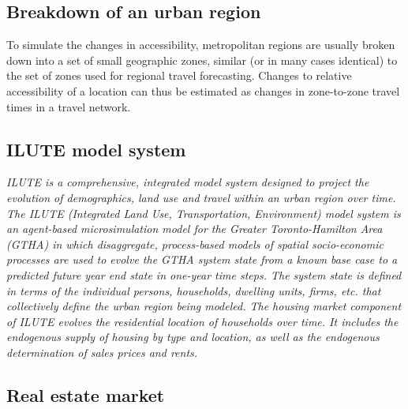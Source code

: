 \subsection{Breakdown of an urban region} \label{subsec:breakdown_of_urban_region}

To simulate the changes in accessibility, metropolitan regions are usually broken down into a set of small geographic zones, similar (or in many cases identical) to the set of zones used for regional travel forecasting.
Changes to relative accessibility of a location can thus be estimated as changes in zone-to-zone travel times in a travel network\cite{Iacono2008}.

\subsection{ILUTE model system} \label{subsec:ilute}

\textit{ILUTE is a comprehensive, integrated model system designed to project the evolution of demographics, land use and travel within an urban region over time.
The ILUTE (Integrated Land Use, Transportation, Environment) model system is an agent-based microsimulation model for the Greater Toronto-Hamilton Area (GTHA) in which disaggregate, process-based models of spatial socio-economic processes are used to evolve the GTHA system state from a known base case to a predicted future year end state in one-year time steps.
The system state is defined in terms of the individual persons, households, dwelling units, firms, etc.
that collectively define the urban region being modeled.
The housing market component of ILUTE evolves the residential location of households over time.
It includes the endogenous supply of housing by type and location, as well as the endogenous determination of sales prices and rents.}\cite{Miller2010}

\subsection{Real estate market} \label{subsec:real_estate_market}

